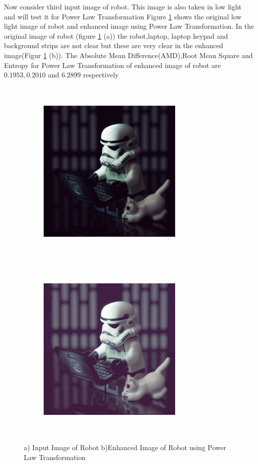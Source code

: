 Now consider third input image of robot. This image is also taken in low light and will test it for Power Law Transformation Figure \ref{fig:robotPowerLaw} shows the original low light image of robot and enhanced image using  Power Law Transformation. In the original image of robot (figure \ref{fig:robotPowerLaw} (a))  the robot,laptop, laptop keypad and background strips are not clear but these are very clear in the enhanced image(Figur \ref{fig:robotPowerLaw} (b)). The Absolute Mean Difference(AMD),Root Mean Square and Entropy for  Power Law Transformation of enhanced image of robot are $0.1953, 0.2010$ and $6.2899$ respectively      


\begin{figure}[!htb]
	\begin{subfigure}{8cm}
		\centering    
    	\includegraphics[width=7cm,height=9cm,keepaspectratio]{images/ch5/robot_input.jpg}
    	\caption{} 
    \end{subfigure}
  	\begin{subfigure}{6cm}
  		\centering
  		\includegraphics[width=7cm,height=9cm,keepaspectratio]{images/ch5/robot_power.jpg}
   		\caption{}
  	\end{subfigure}
  	\caption{a) Input Image of Robot b)Enhanced Image of Robot using Power Law Transformation}
  	\label{fig:robotPowerLaw}
\end{figure}



